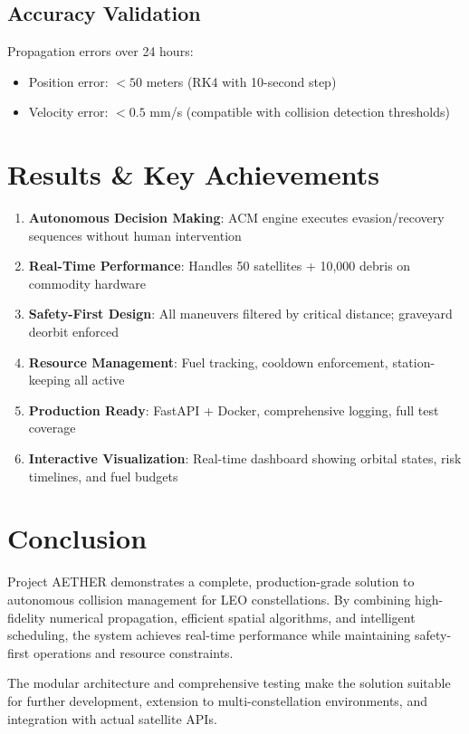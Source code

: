 \documentclass[11pt,a4paper]{article}
\begin{document}
\subsection{Accuracy Validation}

Propagation errors over 24 hours:
\begin{itemize}
    \item Position error: $< 50$ meters (RK4 with 10-second step)
    \item Velocity error: $< 0.5$ mm/s (compatible with collision detection thresholds)
\end{itemize}

\section{Results \& Key Achievements}

\begin{enumerate}
    \item \textbf{Autonomous Decision Making}: ACM engine executes evasion/recovery sequences without human intervention
    \item \textbf{Real-Time Performance}: Handles 50 satellites + 10,000 debris on commodity hardware
    \item \textbf{Safety-First Design}: All maneuvers filtered by critical distance; graveyard deorbit enforced
    \item \textbf{Resource Management}: Fuel tracking, cooldown enforcement, station-keeping all active
    \item \textbf{Production Ready}: FastAPI + Docker, comprehensive logging, full test coverage
    \item \textbf{Interactive Visualization}: Real-time dashboard showing orbital states, risk timelines, and fuel budgets
\end{enumerate}

\section{Conclusion}

Project AETHER demonstrates a complete, production-grade solution to autonomous collision management for LEO constellations. By combining high-fidelity numerical propagation, efficient spatial algorithms, and intelligent scheduling, the system achieves real-time performance while maintaining safety-first operations and resource constraints.

The modular architecture and comprehensive testing make the solution suitable for further development, extension to multi-constellation environments, and integration with actual satellite APIs.
\end{document}
